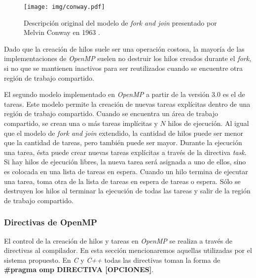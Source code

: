 \begin{figure}[!htb]

	\centering

	\texttt{[image: img/conway.pdf]}

	\caption{Descripción original del modelo de \emph{fork and join}
	presentado por Melvin Conway en 1963 \cite{conway1963}.}

	\label{conway}

\end{figure}

Dado que la creación de hilos suele ser una operación costosa, la mayoría de las
implementaciones de \emph{OpenMP} suelen no destruir los hilos creados durante
el \emph{fork}, si no que se mantienen inactivos para ser reutilizados cuando se
encuentre otra región de trabajo compartido.

El segundo modelo implementado en \emph{OpenMP} a partir de la versión 3.0 es el
de tareas. Este modelo permite la creación de nuevas tareas explícitas dentro de
una región de trabajo compartido. Cuando se encuentra un área de trabajo
compartido, se crean una o más tareas implícitas y $N$ hilos de ejecución. Al
igual que el modelo de \emph{fork and join} extendido, la cantidad de hilos
puede ser menor que la cantidad de tareas, pero también puede ser mayor. Durante
la ejecución una tarea, ésta puede crear nuevas tareas explícitas a través de la
directiva \emph{task}. Si hay hilos de ejecución libres, la nueva tarea será
asignada a uno de ellos, sino es colocada en una lista de tareas en espera.
Cuando un hilo termina de ejecutar una tarea, toma otra de la lista de tareas en
espera de tareas o espera. Sólo se destruyen los hilos al terminar la ejecución
de todas las tareas y salir de la región de trabajo compartido.

\subsubsection{Directivas de OpenMP}

El control de la creación de hilos y tareas en \emph{OpenMP} se realiza a través
de directivas al compilador. En esta sección mencionaremos aquellas utilizadas
por el sistema propuesto. En \emph{C} y \emph{C++} todas las directivas toman la
forma de \textbf{\#pragma omp DIRECTIVA [OPCIONES]}.

